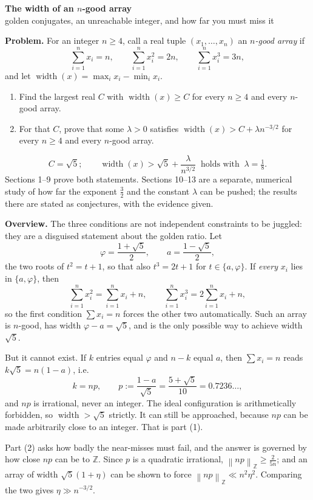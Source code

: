 \documentclass[12pt]{article}
\newcommand{\sumi}{\sum_{i=1}^{n}}
\newcommand{\W}{\operatorname{width}}
\newcommand{\ZZ}{\mathbb Z}
\newcommand{\normZ}[1]{\left\lVert #1\right\rVert_{\ZZ}}
\begin{document}
\begin{center}
{\Large\bfseries The width of an \(n\)-good array}\\[0.35em]
{\large golden conjugates, an unreachable integer, and how far you must miss it}
\end{center}

\textbf{Problem.} For an integer \(n\ge4\), call a real tuple
\((x_1,\dots,x_n)\) an \emph{\(n\)-good array} if
\[
\sumi x_i=n,\qquad \sumi x_i^2=2n,\qquad \sumi x_i^3=3n,
\]
and let \(\W(x)=\max_i x_i-\min_i x_i\).
\begin{enumerate}
\item[(1)] Find the largest real \(C\) with \(\W(x)\ge C\) for every
\(n\ge4\) and every \(n\)-good array.
\item[(2)] For that \(C\), prove that some \(\lambda>0\) satisfies
\(\W(x)>C+\lambda n^{-3/2}\) for every \(n\ge4\) and every \(n\)-good
array.
\end{enumerate}

\[
\boxed{\displaystyle
C=\sqrt5;
\qquad
\W(x)>\sqrt5+\frac{\lambda}{n^{3/2}}
\ \text{ holds with }\ \lambda=\tfrac18. }
\]
Sections 1--9 prove both statements. Sections 10--13 are a separate,
numerical study of how far the exponent \(\frac32\) and the constant
\(\lambda\) can be pushed; the results there are stated as conjectures,
with the evidence given.

\textbf{Overview.}
The three conditions are not independent constraints to be juggled: they
are a disguised statement about the golden ratio. Let
\[
\varphi=\frac{1+\sqrt5}{2},\qquad a=\frac{1-\sqrt5}{2},
\]
the two roots of \(t^2=t+1\), so that also \(t^3=2t+1\) for \(t\in\{a,\varphi\}\).
If \emph{every} \(x_i\) lies in \(\{a,\varphi\}\), then
\[
\sumi x_i^2=\sumi x_i+n,
\qquad
\sumi x_i^3=2\sumi x_i+n,
\]
so the first condition \(\sum x_i=n\) forces the other two automatically.
Such an array is \(n\)-good, has width \(\varphi-a=\sqrt5\), and is the
only possible way to achieve width \(\sqrt5\).

But it cannot exist. If \(k\) entries equal \(\varphi\) and \(n-k\) equal
\(a\), then \(\sum x_i=n\) reads \(k\sqrt5=n(1-a)\), i.e.
\[
k=np,\qquad p:=\frac{1-a}{\sqrt5}=\frac{5+\sqrt5}{10}=0.7236\ldots,
\]
and \(np\) is irrational, never an integer. The ideal configuration is
arithmetically forbidden, so \(\W>\sqrt5\) strictly. It can still be
approached, because \(np\) can be made arbitrarily close to an integer.
That is part (1).

Part (2) asks how badly the near-misses must fail, and the answer is
governed by how close \(np\) can be to \(\ZZ\). Since \(p\) is a
quadratic irrational, \(\normZ{np}\ge\frac2{5n}\); and an array of width
\(\sqrt5(1+\eta)\) can be shown to force \(\normZ{np}\ll n^2\eta^2\).
Comparing the two gives \(\eta\gg n^{-3/2}\).
\end{document}
